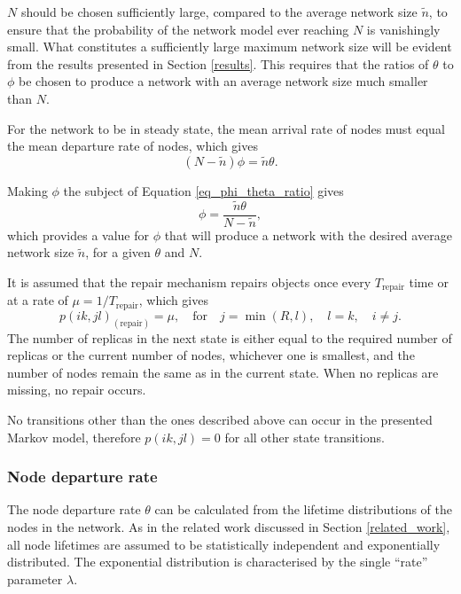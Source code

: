 $N$ should be chosen sufficiently large, compared to the average network size $\tilde{n}$, to ensure that the probability of the network model ever reaching $N$ is vanishingly small. What constitutes a sufficiently large maximum network size will be evident from the results presented in Section \ref{results}. This requires that the ratios of $\theta$ to $\phi$ be chosen to produce a network with an average network size much smaller than $N$.

For the network to be in steady state, the mean arrival rate of nodes must equal the mean departure rate of nodes, which gives
%
\begin{equation}
    (N - \tilde{n})\phi = \tilde{n}\theta.\label{eq_phi_theta_ratio}
\end{equation}

Making $\phi$ the subject of Equation \eqref{eq_phi_theta_ratio} gives
%
\begin{equation}
    \phi = \frac{\tilde{n}\theta}{N - \tilde{n}},\label{eq_phi}
\end{equation}
%
which provides a value for $\phi$ that will produce a network with the desired average network size $\tilde{n}$, for a given $\theta$ and $N$.

It is assumed that the repair mechanism repairs objects once every $T_{\textrm{repair}}$ time or at a rate of $\mu = 1/T_{\textrm{repair}}$, which gives
%
\begin{equation} \label{eq_repair}
    p(i k,j l)_{(\textrm{repair})} = \mu,\quad\textrm{for}\quad j = \min(R, l),\quad l = k,\quad i \neq j.
\end{equation}
%
The number of replicas in the next state is either equal to the required number of replicas or the current number of nodes, whichever one is smallest, and the number of nodes remain the same as in the current state. When no replicas are missing, no repair occurs.

No transitions other than the ones described above can occur in the presented Markov model, therefore $p(i k,j l) = 0$ for all other state transitions.

\subsubsection{Node departure rate}

The node departure rate $\theta$ can be calculated from the lifetime distributions of the nodes in the network. As in the related work discussed in Section \ref{related_work}, all node lifetimes are assumed to be statistically independent and exponentially distributed. The exponential distribution is characterised by the single ``rate'' parameter $\lambda$.


